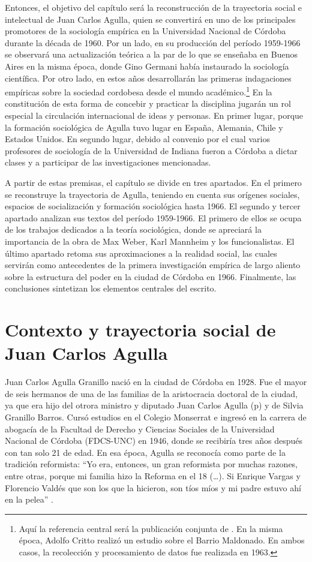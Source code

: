 Entonces, el objetivo del capítulo será la reconstrucción de la trayectoria social e intelectual de Juan Carlos Agulla, quien se convertirá en uno de los principales promotores de la sociología empírica en la Universidad Nacional de Córdoba durante la década de 1960. Por un lado, en su producción del período 1959-1966 se observará una actualización teórica a la par de lo que se enseñaba en Buenos Aires en la misma época, donde Gino Germani había instaurado la sociología científica. Por otro lado, en estos años desarrollarán las primeras indagaciones empíricas sobre la sociedad cordobesa desde el mundo académico.\footnote{Aquí la referencia central será la publicación conjunta de \textcite{1633-AGULLA1966}. En la misma época, Adolfo Critto realizó un estudio sobre el Barrio Maldonado. En ambos casos, la recolección y procesamiento de datos fue realizada en 1963.} En la constitución de esta forma de concebir y practicar la disciplina jugarán un rol especial la circulación internacional de ideas y personas. En primer lugar, porque la formación sociológica de Agulla tuvo lugar en España, Alemania, Chile y Estados Unidos. En segundo lugar, debido al convenio por el cual varios profesores de sociología de la Universidad de Indiana fueron a Córdoba a dictar clases y a participar de las investigaciones mencionadas.

A partir de estas premisas, el capítulo se divide en tres apartados. En el primero se reconstruye la trayectoria de Agulla, teniendo en cuenta sus orígenes sociales, espacios de socialización y formación sociológica hasta 1966. El segundo y tercer apartado analizan sus textos del período 1959-1966. El primero de ellos se ocupa de los trabajos dedicados a la teoría sociológica, donde se apreciará la importancia de la obra de Max Weber, Karl Mannheim y los funcionalistas. El último apartado retoma sus aproximaciones a la realidad social, las cuales servirán como antecedentes de la primera investigación empírica de largo aliento sobre la estructura del poder en la ciudad de Córdoba en 1966. Finalmente, las conclusiones sintetizan los elementos centrales del escrito.

\section{Contexto y trayectoria social de Juan Carlos Agulla}

Juan Carlos Agulla Granillo nació en la ciudad de Córdoba en 1928. Fue el mayor de seis hermanos de una de las familias de la aristocracia doctoral de la ciudad, ya que era hijo del otrora ministro y diputado Juan Carlos Agulla (p) y de Silvia Granillo Barros. Cursó estudios en el Colegio Monserrat e ingresó en la carrera de abogacía de la Facultad de Derecho y Ciencias Sociales de la Universidad Nacional de Córdoba (FDCS-UNC) en 1946, donde se recibiría tres años después con tan solo 21 de edad. En esa época, Agulla se reconocía como parte de la tradición reformista: \enquote{Yo era, entonces, un gran reformista por muchas razones, entre otras, porque mi familia hizo la Reforma en el 18 (\dots). Si Enrique Vargas y Florencio Valdés que son los que la hicieron, son tíos míos y mi padre estuvo ahí en la pelea} \parencite[276]{1626-FUCITO2004}.


